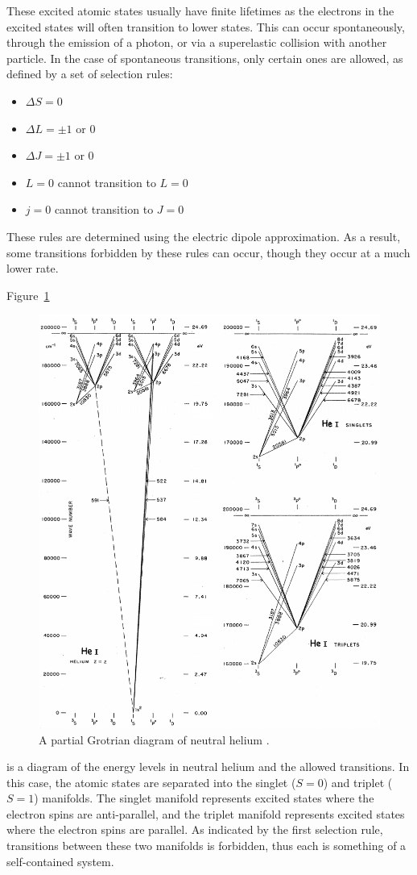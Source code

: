 These excited atomic states usually have finite lifetimes as the electrons in
the excited states will often transition to lower states. This can occur
spontaneously, through the emission of a photon, or via a superelastic collision
with another particle. In the case of spontaneous transitions, only certain ones
are allowed, as defined by a set of selection rules:
\begin{itemize}
  \item $\Delta S = 0$
  \item $\Delta L = \pm1$ or 0
  \item $\Delta J = \pm1$ or 0
  \item $L=0$ cannot transition to $L=0$
  \item $j=0$ cannot transition to $J=0$
\end{itemize}
These rules are determined using the electric dipole approximation. As a result,
some transitions forbidden by these rules can occur, though they occur at a much
lower rate.

Figure~\ref{fig:grotrian}
\begin{figure}
  \centering
  \includegraphics{./chapters/theory/figures/grotrian.pdf}
  \caption{A partial Grotrian diagram of neutral helium \cite{Moore1968}.}
  \label{fig:grotrian}
\end{figure}
is a diagram of the energy levels in neutral helium and the allowed transitions.
In this case, the atomic states are separated into the singlet ($S=0$) and
triplet ($S = 1$) manifolds. The singlet manifold represents excited states
where the electron spins are anti-parallel, and the triplet manifold represents
excited states where the electron spins are parallel. As indicated by the first
selection rule, transitions between these two manifolds is forbidden, thus each
is something of a self-contained system.

